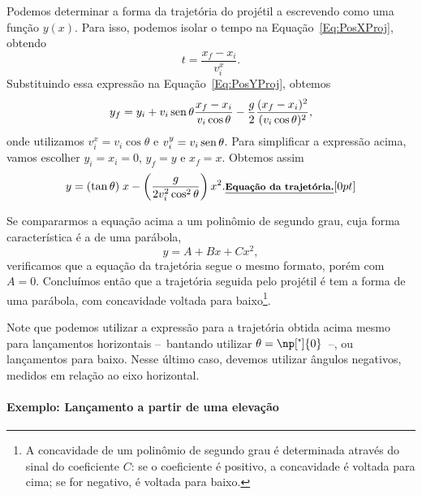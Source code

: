 Podemos determinar a forma da trajetória do projétil a escrevendo como uma função $y(x)$. Para isso, podemos isolar o tempo na Equação~\eqref{Eq:PosXProj}, obtendo
\begin{equation}
  t = \frac{x_f - x_i}{v_{i}^{x}}.
\end{equation}
%
Substituindo essa expressão na Equação~\eqref{Eq:PosYProj}, obtemos
\begin{equation}
  y_f = y_i + v_i\operatorname{sen}\theta \frac{x_f-x_i}{v_i\cos\theta} - \frac{g}{2}\frac{(x_f-x_i)^2}{(v_i\cos\theta)^2},
\end{equation}
%
onde utilizamos $v_{i}^{x} = v_i\cos\theta$ e $v_{i}^{y} = v_i\operatorname{sen}\theta$. Para simplificar a expressão acima, vamos escolher $y_i = x_i = 0$, $y_f = y$ e $x_f = x$. Obtemos assim
\begin{equation}\label{Eq:EqDaTrajetoria}
  y = (\tan\theta) \; x - \left(\frac{g}{2v_i^2\cos^2\theta}\right) x^2. \relax{\footnotesize\emph{\textbf{Equação da trajetória.}}}[0pt]
\end{equation}

Se compararmos a equação acima a um polinômio de segundo grau, cuja forma característica é a de uma parábola, 
\begin{equation}
  y = A + B x + C x^2,
\end{equation}
%
verificamos que a equação da trajetória segue o mesmo formato, porém com $A = 0$. Concluímos então que a trajetória seguida pelo projétil é tem a forma de uma parábola, com concavidade voltada para baixo\footnote{A concavidade de um polinômio de segundo grau é determinada através do sinal do coeficiente $C$: se o coeficiente é positivo, a concavidade é voltada para cima; se for negativo, é voltada para baixo.}.

Note que podemos utilizar a expressão para a trajetória obtida acima mesmo para lançamentos horizontais --~bantando utilizar $\theta = \np[\tcdegree]{0}$~--, ou lançamentos para baixo. Nesse último caso, devemos utilizar ângulos negativos, medidos em relação ao eixo horizontal.

\paragraph{Exemplo: Lançamento a partir de uma elevação}

